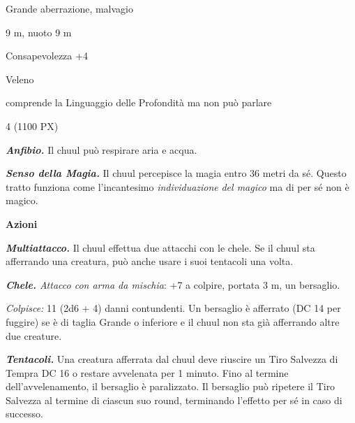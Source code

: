 \begin{multicols}{2}
{
\begin{description}[noitemsep, topsep=0pt, parsep=0pt, partopsep=0pt, itemsep=1pt, leftmargin=2.35cm,  labelwidth=2.2cm, itemindent=0cm, listparindent=0pt] %
\setlength{\baselineskip}{10pt}
\item[\textbf{Taglia/Tipo}] Grande aberrazione, malvagio
\item[\textbf{Caratt.}] 
\item[\textbf{Punti Ferita}] 
\item[\textbf{Movimento}] 9 m, nuoto 9 m
\item[\textbf{Tiri Salvez.}] 
\item[\textbf{Comp.}] Consapevolezza +4
\item[\textbf{Imm. Danni}] Veleno
\item[\textbf{Sensi}] 
\item[\textbf{Linguaggi}] comprende la Linguaggio delle Profondità ma non può parlare
\item[\textbf{Sfida}] 4 (1100 PX)
\end{description}
\smallskip

\emph{\textbf{Anfibio.}} Il chuul può respirare aria e acqua.

\emph{\textbf{Senso della Magia.}} Il chuul percepisce la magia entro 36 metri da sé. Questo tratto funziona come l'incantesimo \emph{individuazione} \emph{del magico} ma di per sé non è magico.

\textbf{Azioni}

\emph{\textbf{Multiattacco.}} Il chuul effettua due attacchi con le chele. Se il chuul sta afferrando una creatura, può anche usare i suoi tentacoli una volta.

\emph{\textbf{Chele.} Attacco con arma da mischia}: +7 a colpire, portata 3 m, un bersaglio.

\emph{Colpisce:} 11 (2d6 + 4) danni contundenti. Un bersaglio è afferrato (DC 14 per fuggire) se è di taglia Grande o inferiore e il chuul non sta già afferrando altre due creature.

\emph{\textbf{Tentacoli.}} Una creatura afferrata dal chuul deve riuscire un Tiro Salvezza di Tempra DC 16 o restare avvelenata per 1 minuto. Fino al termine dell'avvelenamento, il bersaglio è paralizzato. Il bersaglio può ripetere il Tiro Salvezza al termine di ciascun suo round, terminando l'effetto per sé in caso di successo.

}
\end{multicols}
